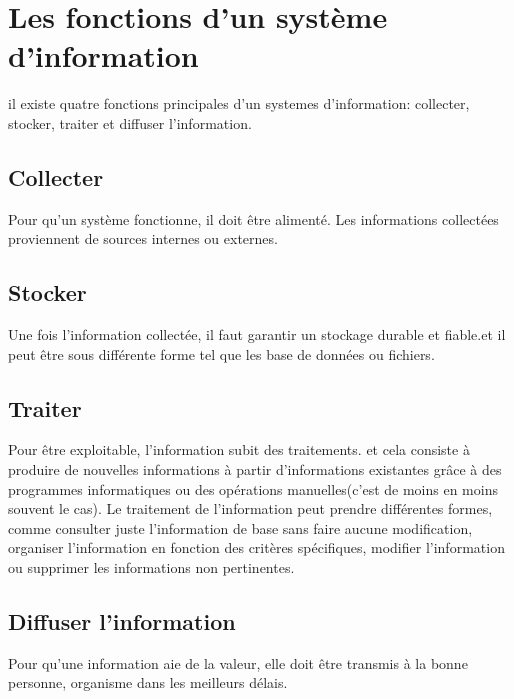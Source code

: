 \documentclass[12pt, letterpaper]{article}
\begin{document}
\section{Les fonctions d’un système d’information}
il existe quatre fonctions principales d'un systemes d'information: 
collecter, stocker, traiter et diffuser l’information.

    \subsection{Collecter}
     Pour qu'un système fonctionne, il doit être alimenté. Les informations 
     collectées proviennent de sources internes ou externes. 
    
    \subsection{Stocker}
     Une fois l’information collectée, il faut garantir un stockage durable et 
     fiable.et il peut être sous différente forme tel que les base de données 
     ou fichiers.

    \subsection{Traiter}
     Pour être exploitable, l’information subit des traitements. et cela consiste
     à produire de nouvelles informations à partir d’informations existantes grâce 
     à des programmes informatiques ou des opérations manuelles(c’est de moins en 
     moins souvent le cas).
     Le traitement de l’information peut prendre différentes formes, comme consulter 
     juste l’information de base sans faire aucune modification, organiser l’information
      en fonction des critères spécifiques, modifier l’information ou supprimer les 
      informations non pertinentes.
    
    \subsection{Diffuser l'information}
     Pour qu’une information aie de la valeur, elle doit être transmis à la bonne personne, 
     organisme dans les meilleurs délais.   
\end{document}
